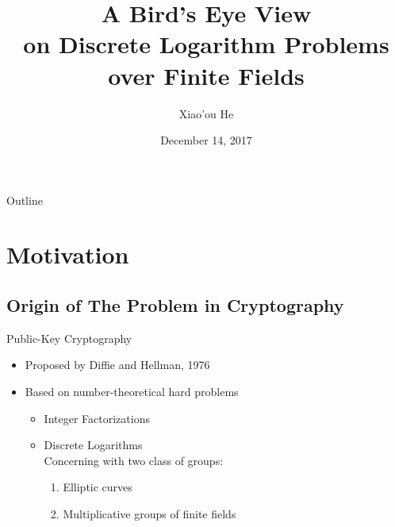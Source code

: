 \documentclass{beamer}
\title[Short Paper Title]
{A Bird's Eye View\\on Discrete Logarithm Problems\\over Finite Fields}
\author[He]
{Xiao'ou He}
\institute[Universities of Somewhere and Elsewhere]
{Key Laboratory of Mathematics Mechanization, AMSS}
\date[Annual 2017]
{December 14, 2017}
\begin{document}
\begin{frame}
  \titlepage
\end{frame}

\begin{frame}{Outline}
  \tableofcontents[pausesections]
\end{frame}

\section{Motivation}

	\subsection{Origin of The Problem in Cryptography}
		\begin{frame}{Public-Key Cryptography}
			\begin{itemize}
				\item
					Proposed by Diffie and Hellman, 1976
				\item
					Based on number-theoretical hard problems
					\begin{itemize}
						\item
							Integer Factorizations
						\item
							\alert{Discrete Logarithms}\\
							Concerning with two class of groups:
							\begin{enumerate}
								\item
									Elliptic curves
								\item
									\alert{Multiplicative groups of finite fields}
							\end{enumerate}
					\end{itemize}
			\end{itemize}
		\end{frame}
\end{document}
